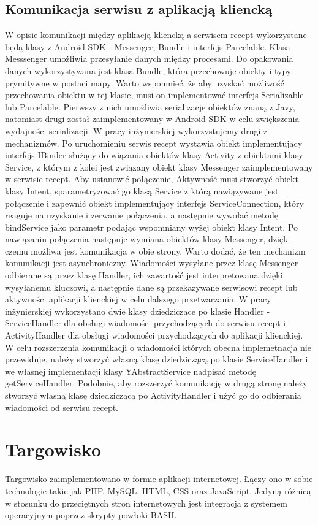 \documentclass[11pt,a4paper,polish,thesis]{dcsbook}
\begin{document}
\subsection{Komunikacja serwisu z aplikacją kliencką}
W opisie komunikacji między aplikacją kliencką a serwisem recept wykorzystane będą klasy z Android SDK - Messenger, Bundle i interfejs Parcelable. Klasa Messsenger umożliwia przesyłanie danych między procesami. \cite{android.mesage} Do opakowania danych wykorzystywana jest klasa Bundle, która przechowuje obiekty i typy prymitywne w postaci mapy. Warto wspomnieć, że aby uzyskać możliwość przechowania obiektu w tej klasie, musi on implementować interfejs Serializable lub Parcelable. Pierwszy z nich umożliwia serializacje obiektów znaną z Javy, natomiast drugi został zaimplementowany w Android SDK w celu zwiększenia wydajności serializacji. W pracy inżynierskiej wykorzystujemy drugi z mechanizmów. Po uruchomieniu serwis recept wystawia obiekt implementujący interfejs IBinder służący do wiązania obiektów klasy Activity z obiektami klasy Service,  z którym z kolei jest związany obiekt klasy Messenger zaimplementowany w serwisie recept. Aby ustanowić połączenie, Aktywność musi stworzyć obiekt klasy Intent, sparametryzować go klasą Service z którą nawiązywane jest połączenie i zapewnić obiekt implementujący interfejs ServiceConnection, który reaguje na uzyskanie i zerwanie połączenia, a następnie wywołać metodę bindService jako parametr podając wspomniany wyżej obiekt klasy Intent. Po nawiązaniu połączenia następuje wymiana obiektów klasy Messenger, dzięki czemu możliwa jest komunikacja w obie strony. Warto dodać, że ten mechanizm komunikacji jest asynchroniczny. Wiadomości wysyłane przez klasę Messenger odbierane są przez klasę Handler, ich zawartość jest interpretowana dzięki wysyłanemu kluczowi, a następnie dane są przekazywane serwisowi recept lub aktywności aplikacji klienckiej w celu dalszego przetwarzania. W pracy inżynierskiej wykorzystano dwie klasy dziedziczące po klasie Handler - ServiceHandler dla obsługi wiadomości przychodzących do serwisu recept i ActivityHandler dla obsługi wiadomości przychodzących do aplikacji klienckiej. W celu rozszerzenia komunikacji o wiadomości których obecna implemetnacja nie przewiduje, należy stworzyć własną klasę dziedziczącą po klasie ServiceHandler i we własnej implementacji klasy YAbstractService nadpisać metodę getServiceHandler. Podobnie, aby rozszerzyć komunikację w drugą stronę należy stworzyć własną klasę dziedziczącą po ActivityHandler i użyć go do odbierania wiadomości od serwisu recept.
\section{Targowisko}
Targowisko zaimplementowano w formie aplikacji internetowej. Łączy ono w sobie technologie takie jak PHP, MySQL, HTML, CSS oraz JavaScript. Jedyną różnicą w stosunku
do przeciętnych stron internetowych jest integracja z systemem operacyjnym poprzez skrypty powłoki BASH.
\end{document}
